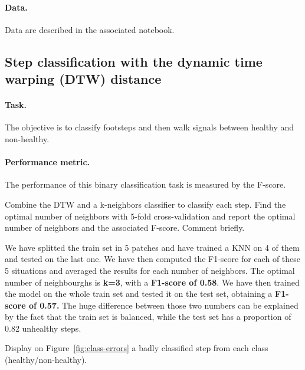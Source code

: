 \documentclass[11pt]{article}
\begin{document}
\paragraph{Data.}
Data are described in the associated notebook.

\subsection{Step classification with the dynamic time warping (DTW) distance}

\paragraph{Task.} The objective is to classify footsteps and then walk signals between healthy and non-healthy.

\paragraph{Performance metric.} The performance of this binary classification task is measured by the F-score.


\begin{exercise}
Combine the DTW and a k-neighbors classifier to classify each step. Find the optimal number of neighbors with 5-fold cross-validation and report the optimal number of neighbors and the associated F-score. Comment briefly.
\end{exercise}

\begin{solution}



We have splitted the train set in 5 patches and have trained a KNN on 4 of them and tested on the last one.
We have then computed the F1-score for each of these 5 situations and averaged the results for each number of neighbors. 
The optimal number of neighbourghs is \textbf{k=3}, with a \textbf{F1-score of 0.58}. 
We have then trained the model on the whole train set and tested it on the test set, obtaining a \textbf{F1-score of 0.57.} 
The huge difference between those two numbers can be explained by the fact that the train set is balanced,  while the test set has a proportion of 0.82 unhealthy steps. 

\end{solution}


\newpage
\begin{exercise}\label{q:class-errors}
Display on Figure~\ref{fig:class-errors} a badly classified step from each class (healthy/non-healthy).
\end{exercise}
\end{document}
